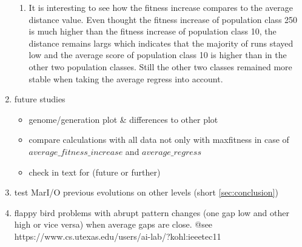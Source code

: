 \begin{enumerate}
\begin{enumerate}
		\item It is interesting to see how the fitness increase compares to the average distance value. Even thought the fitness increase of population class 250 is much higher than the fitness increase of population class 10, the distance remains largs which indicates that the majority of runs stayed low and the average score of population class 10 is higher than in the other two population classes. Still the other two classes remained more stable when taking the average regress into account.
	\end{enumerate}
	\item future studies
	\begin{itemize}
		\item genome/generation plot \& differences to other plot
		\item compare calculations with all data not only with maxfitness in case of $average\_fitness\_increase$ and $average\_regress$
		\item check in text for (future or further)
	\end{itemize}
	\item test MarI/O previous evolutions on other levels (short \ref{sec:conclusion})
	\item flappy bird problems with abrupt pattern changes (one gap low and other high or vice versa) when average gaps are close. @see https://www.cs.utexas.edu/users/ai-lab/?kohl:ieeetec11
\end{enumerate}
